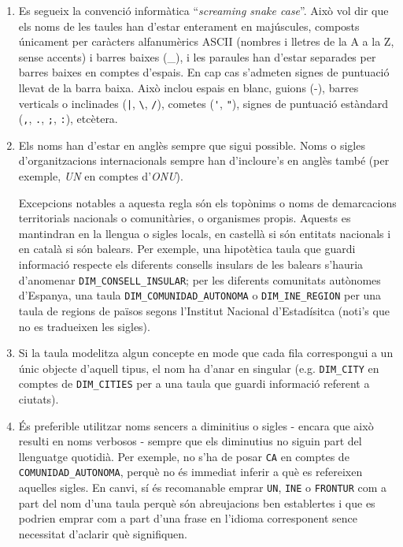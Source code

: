 \documentclass{article}
\theoremstyle{definition}
\begin{document}
\begin{enumerate}
  \item Es segueix la convenció informàtica ``\emph{screaming snake case}''. Això vol dir que els noms de les taules han d'estar enterament en majúscules, composts únicament per caràcters alfanumèrics ASCII (nombres i lletres de la A a la Z, sense accents) i barres baixes (\_), i les paraules han d'estar separades per barres baixes en comptes d'espais. En cap cas s'admeten signes de puntuació llevat de la barra baixa. Això inclou espais en blanc, guions (-), barres verticals o inclinades (\verb'|', \verb|\|, \verb|/|), cometes (\verb|'|, \verb|"|), signes de puntuació estàndard (\verb|,|, \verb|.|, \verb|;|, \verb|:|), etcètera.

  \item Els noms han d'estar en anglès sempre que sigui possible. Noms o sigles d'organitzacions internacionals sempre han d'incloure's en anglès també (per exemple, \emph{UN} en comptes d'\emph{ONU}).

  Excepcions notables a aquesta regla són els topònims o noms de demarcacions territorials nacionals o comunitàries, o organismes propis. Aquests es mantindran en la llengua o sigles locals, en castellà si són entitats nacionals i en català si són balears. Per exemple, una hipotètica taula que guardi informació respecte els diferents consells insulars de les balears s'hauria d'anomenar \verb|DIM_CONSELL_INSULAR|; per les diferents comunitats autònomes d'Espanya, una taula \verb|DIM_COMUNIDAD_AUTONOMA| o \verb|DIM_INE_REGION| per una taula de regions de països segons l'Institut Nacional d'Estadísitca (noti's que no es tradueixen les sigles).

  \item Si la taula modelitza algun concepte en mode que cada fila correspongui a un únic objecte d'aquell tipus, el nom ha d'anar en singular (e.g. \verb|DIM_CITY| en comptes de \verb|DIM_CITIES| per a una taula que guardi informació referent a ciutats).

  \item És preferible utilitzar noms sencers a diminitius o sigles - encara que això resulti en noms verbosos - sempre que els diminutius no siguin part del llenguatge quotidià. Per exemple, no s'ha de posar \verb|CA| en comptes de \verb|COMUNIDAD_AUTONOMA|, perquè no és immediat inferir a què es refereixen aquelles sigles. En canvi, sí és recomanable emprar \verb|UN|, \verb|INE| o \verb|FRONTUR| com a part del nom d'una taula perquè són abreujacions ben establertes i que es podrien emprar com a part d'una frase en l'idioma corresponent sence necessitat d'aclarir què signifiquen.
\end{enumerate}
\end{document}
